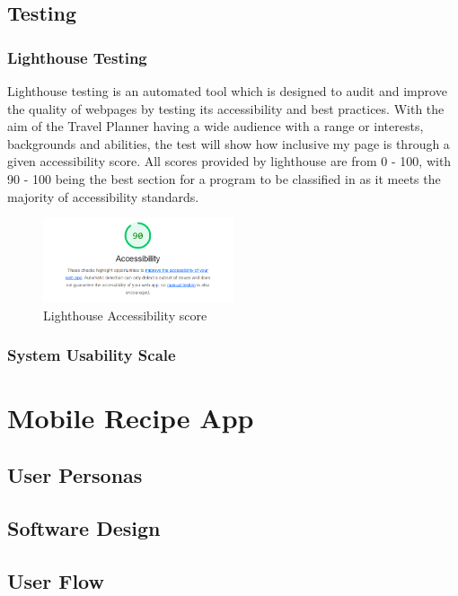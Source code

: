 \documentclass[]{project_final}
\begin{document}
\subsection{Testing}
\subsubsection{Lighthouse Testing}
Lighthouse testing is an automated tool which is designed to audit and improve the quality of webpages by testing its accessibility and best practices. With the aim of the Travel Planner having a wide audience with a range or interests, backgrounds and abilities, the test will show how inclusive my page is through a given accessibility score.
All scores provided by lighthouse are from 0 - 100, with 90 - 100 being the best section for a program to be classified in as it meets the majority of accessibility standards.

\begin{figure}[ht!]
  \centering
  \includegraphics[width=0.5\textwidth]{lighthouse.png}
  \vspace*{0.0cm}
  \caption{Lighthouse Accessibility score}
  \label{fig:1}
\end{figure}

\subsubsection{System Usability Scale}


\section{Mobile Recipe App}
\subsection{User Personas}
\subsection{Software Design}
\subsection{User Flow}
\end{document}
